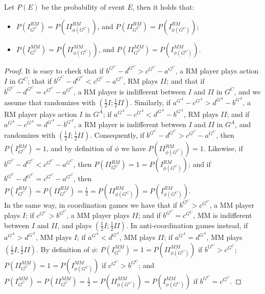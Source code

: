 \documentclass[fleqn,reqno,11pt]{article}
\begin{document}
\medskip{}

\begin{lemma}
Let $P(E)$ be the probability of event $E$, then
it holds that:
\begin{itemize}
\item $P(I_{G^{C}}^{RM})=P(II_{\phi(G^{C})}^{RM})$, and $P(II_{G^{C}}^{RM})=P(I_{\phi(G^{C})}^{RM})$;
\item $P(I_{G^{C}}^{MM})=P(II_{\phi(G^{C})}^{MM})$, and $P(II_{G^{C}}^{MM})=P(I_{\phi(G^{C})}^{MM})$.
\end{itemize}
\end{lemma}

\begin{proof}
It is easy to check that if $b^{G^{C}}-d^{G^{C}}>c^{G^{C}}-a^{G^{C}}$,
a RM player plays action $I$ in $G^{C}$; that if $b^{G^{C}}-d^{G^{C}}<c^{G^{C}}-a^{G^{C}}$,
RM plays $II$; and that if $b^{G^{C}}-d^{G^{C}}=c^{G^{C}}-a^{G^{C}}$,
a RM player is indifferent between $I$ and $II$ in $G^{C}$, and
we assume that randomizes with $(\frac{1}{2}I;\frac{1}{2}II)$. Similarly,
if $a^{G^{A}}-c^{G^{A}}>d^{G^{A}}-b^{G^{A}}$, a RM player plays action
$I$ in $G^{A}$; if $a^{G^{A}}-c^{G^{A}}<d^{G^{A}}-b^{G^{A}}$, RM
plays $II$; and if $a^{G^{A}}-c^{G^{A}}=d^{G^{A}}-b^{G^{A}}$, a
RM player is indifferent between $I$ and $II$ in $G^{A}$, and randomizes
with $(\frac{1}{2}I;\frac{1}{2}II)$. Consequently, if $b^{G^{C}}-d^{G^{C}}>c^{G^{C}}-a^{G^{C}}$,
then $P(I_{G^{C}}^{RM})=1$, and by definition of $\phi$ we have
$P(II_{\phi(G^{C})}^{RM})=1$. Likewise, if $b^{G^{C}}-d^{G^{C}}<c^{G^{C}}-a^{G^{C}}$,
then $P(II_{G^{C}}^{RM})=1=P(I_{\phi(G^{C})}^{RM})$; and if $b^{G^{C}}-d^{G^{C}}=c^{G^{C}}-a^{G^{C}}$,
then $P(I_{G^{C}}^{RM})=P(II_{G^{C}}^{RM})=\frac{1}{2}=P(II_{\phi(G^{C})}^{RM})=P(I_{\phi(G^{C})}^{RM})$. \\
In the same way, in coordination games we have that if $b^{G^{C}}>c^{G^{C}}$,
a MM player plays $I$; if $c^{G^{C}}>b^{G^{C}}$, a MM player plays
$II$; and if $b^{G^{C}}=c^{G^{C}}$, MM is indifferent between $I$
and $II$, and plays $(\frac{1}{2}I;\frac{1}{2}II)$. In anti-coordination
games instead, if $a^{G^{A}}>d^{G^{A}}$, MM plays $I$; if $a^{G^{A}}<d^{G^{A}}$,
MM plays $II$; if $a^{G^{A}}=d^{G^{A}}$, MM plays $(\frac{1}{2}I;\frac{1}{2}II)$.
By definition of $\phi$: $P(I_{G^{C}}^{MM})=1=P(II_{\phi(G^{C})}^{MM})$
if $b^{G^{C}}>c^{G^{C}}$; $P(II_{G^{C}}^{MM})=1=P(I_{\phi(G^{C})}^{MM})$
if $c^{G^{C}}>b^{G^{C}}$; and $P(I_{G^{C}}^{MM})=P(II_{G^{C}}^{MM})=\frac{1}{2}=P(II_{\phi(G^{C})}^{MM})=P(I_{\phi(G^{C})}^{MM})$
if $b^{G^{C}}=c^{G^{C}}$.
\end{proof}
\end{document}
